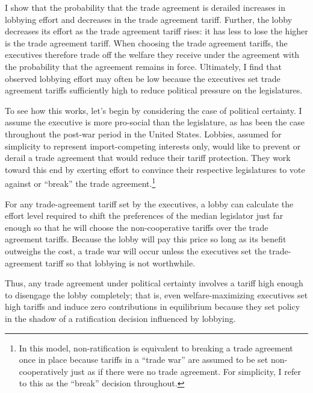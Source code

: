 \documentclass[10pt]{article}
\begin{document}
I show that the probability that the trade agreement is derailed increases in lobbying effort and decreases in the trade agreement tariff. Further, the lobby decreases its effort as the trade agreement tariff rises: it has less to lose the higher is the trade agreement tariff. When choosing the trade agreement tariffs, the executives therefore trade off the welfare they receive under the agreement with the probability that the agreement remains in force. Ultimately, I find that observed lobbying effort may often be low because the executives set trade agreement tariffs sufficiently high to reduce political pressure on the legislatures.

To see how this works, let's begin by considering the case of political certainty. I assume the executive is more pro-social than the legislature, as has been the case throughout the post-war period in the United States. Lobbies, assumed for simplicity to represent import-competing interests only, would like to prevent or derail a trade agreement that would reduce their tariff protection. They work toward this end by exerting effort to convince their respective legislatures to vote against or ``break'' the trade agreement.\footnote{In this model, non-ratification is equivalent to breaking a trade agreement once in place because tariffs in a ``trade war'' are assumed to be set non-cooperatively just as if there were no trade agreement. For simplicity, I refer to this as the ``break'' decision throughout.}

For any trade-agreement tariff set by the executives, a lobby can calculate the effort level required to shift the preferences of the median legislator just far enough so that he will choose the non-cooperative tariffs over the trade agreement tariffs. Because the lobby will pay this price so long as its benefit outweighs the cost, a trade war will occur unless the executives set the trade-agreement tariff so that lobbying is not worthwhile.

Thus, any trade agreement under political certainty involves a tariff high enough to disengage the lobby completely; that is, even welfare-maximizing executives set high tariffs and induce zero contributions in equilibrium because they set policy in the shadow of a ratification decision influenced by lobbying.
\end{document}
